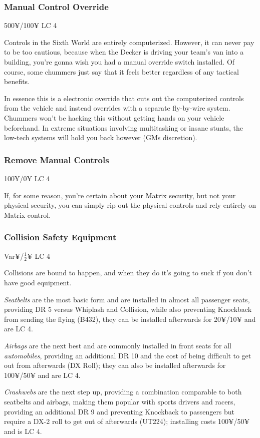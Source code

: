 \begin{multicols*}{2}
	\subsubsection{Manual Control Override}
	500¥/100¥ LC 4
	
	Controls in the Sixth World are entirely computerized. However, it can never pay to be too cautious, because when the Decker is driving your team's van into a building, you're gonna wish you had a manual override switch installed. Of course, some chummers just say that it feels better regardless of any tactical benefits.
	
	In essence this is a electronic override that cuts out the computerized controls from the vehicle and instead overrides with a separate fly-by-wire system. Chummers won't be hacking this without getting hands on your vehicle beforehand. In extreme situations involving multitasking or insane stunts, the low-tech systems will hold you back however (GMs discretion).
	
	\subsubsection{Remove Manual Controls}
	100¥/0¥ LC 4
	
	If, for some reason, you're certain about your Matrix security, but not your physical security, you can simply rip out the physical controls and rely entirely on Matrix control.
	
	\subsubsection{Collision Safety Equipment}
	Var¥/$\frac{1}{2}$¥ LC 4
	
	Collisions are bound to happen, and when they do it's going to suck if you don't have good equipment. 
	
	\textit{Seatbelts} are the most basic form and are installed in almost all passenger seats, providing DR 5 versus Whiplash and Collision, while also preventing Knockback from sending the flying (B432), they can be installed afterwards for 20¥/10¥ and are LC 4. 
	
	\textit{Airbags} are the next best and are commonly installed in front seats for all \textit{automobiles}, providing an additional DR 10 and the cost of being difficult to get out from afterwards (DX Roll); they can also be installed afterwards for 100¥/50¥ and are LC 4. 
	
	\textit{Crashwebs} are the next step up, providing a combination comparable to both seatbelts and airbags, making them popular with sports drivers and racers, providing an additional DR 9 and preventing Knockback to passengers but require a DX-2 roll to get out of afterwards (UT224); installing costs 100¥/50¥ and is LC 4. 
	

\end{multicols*}
